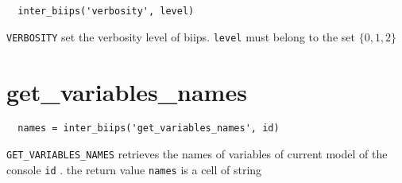 \documentclass[11pt]{article}
\begin{document}
 \begin{lstlisting}
  inter_biips('verbosity', level) 
 \end{lstlisting}

  \texttt{VERBOSITY} set the verbosity level of biips. \texttt{level} must belong to the set $\{0,1,2\}$

\section{get\_variables\_names}

 \begin{lstlisting}
  names = inter_biips('get_variables_names', id)
 \end{lstlisting}

 \texttt{GET\_VARIABLES\_NAMES} retrieves the names of variables of current model of the console \texttt{id} . the return value \texttt{names}
 is a cell of string
\end{document}
